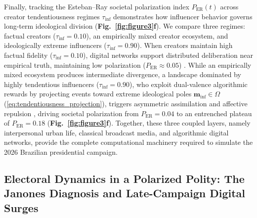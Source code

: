 \documentclass{article}
\begin{document}
Finally, tracking the Esteban--Ray societal polarization index $P_{\mathrm{ER}}(t)$ across creator tendentiousness regimes $\tau_{\mathrm{inf}}$ demonstrates how influencer behavior governs long-term ideological division (\textbf{Fig.~\ref{fig:figure3}f}). We compare three regimes: factual creators ($\tau_{\mathrm{inf}} = 0.10$), an empirically mixed creator ecosystem, and ideologically extreme influencers ($\tau_{\mathrm{inf}} = 0.90$). When creators maintain high factual fidelity ($\tau_{\mathrm{inf}} = 0.10$), digital networks support distributed deliberation near empirical truth, maintaining low polarization ($P_{\mathrm{ER}} \approx 0.05$) \citep{esteban1994measurement}. While an empirically mixed ecosystem produces intermediate divergence, a landscape dominated by highly tendentious influencers ($\tau_{\mathrm{inf}} = 0.90$), who exploit dual-valence algorithmic rewards by projecting events toward extreme ideological poles $\mathbf{m}_{\mathrm{inf}} \in \Omega$ (\cref{eq:tendentiousness_projection}), triggers asymmetric assimilation and affective repulsion \citep{bail2018exposure, sasahara2021social}, driving societal polarization from $P_{\mathrm{ER}} = 0.04$ to an entrenched plateau of $P_{\mathrm{ER}} = 0.18$ (\textbf{Fig.~\ref{fig:figure3}f}). Together, these three coupled layers, namely interpersonal urban life, classical broadcast media, and algorithmic digital networks, provide the complete computational machinery required to simulate the 2026 Brazilian presidential campaign.



\subsection{Electoral Dynamics in a Polarized Polity: The Janones Diagnosis and Late-Campaign Digital Surges}
\label{subsec:results_electoral_janones}
\end{document}
